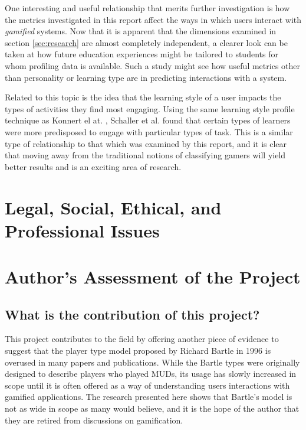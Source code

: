 \documentclass[12pt,a4paper,twoside]{report}
\begin{document}
One interesting and useful relationship that merits further investigation is how the metrics investigated in this report affect the ways in which users interact with \textit{gamified} systems. Now that it is apparent that the dimensions examined in section \ref{sec:research} are almost completely independent, a clearer look can be taken at how future education experiences might be tailored to students for whom profiling data is available. Such a study might see how useful metrics other than personality or learning type are in predicting interactions with a system.

Related to this topic is the idea that the learning style of a user impacts the types of activities they find most engaging. Using the same learning style profile technique as Konnert el at. \cite{konertmodeling}, Schaller et al. \cite{one-size} found that certain types of learners were more predisposed to engage with particular types of task. This is a similar type of relationship to that which was examined by this report, and it is clear that moving away from the traditional notions of classifying gamers will yield better results and is an exciting area of research.

\chapter{Legal, Social, Ethical, and Professional Issues}
\label{sec:issues}

\chapter{Author's Assessment of the Project}
\section{What is the contribution of this project?}
This project contributes to the field by offering another piece of evidence to suggest that the player type model proposed by Richard Bartle in 1996 is overused in many papers and publications. While the Bartle types were originally designed to describe players who played MUDs, its usage has slowly increased in scope until it is often offered as a way of understanding users interactions with gamified applications. The research presented here shows that Bartle's model is not as wide in scope as many would believe, and it is the hope of the author that they are retired from discussions on gamification.
\end{document}
